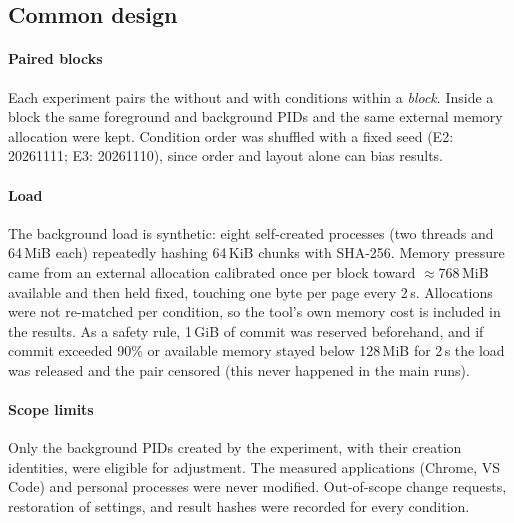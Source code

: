 \documentclass[11pt]{article}
\begin{document}
\subsection{Common design}
\paragraph{Paired blocks}
Each experiment pairs the without and with conditions within a \emph{block}. Inside a block the same foreground and background PIDs and the same external memory allocation were kept. Condition order was shuffled with a fixed seed (E2: 20261111; E3: 20261110), since order and layout alone can bias results.

\paragraph{Load}
The background load is synthetic: eight self-created processes (two threads and 64\,MiB each) repeatedly hashing 64\,KiB chunks with SHA-256. Memory pressure came from an external allocation calibrated once per block toward $\approx$768\,MiB available and then held fixed, touching one byte per page every 2\,s. Allocations were not re-matched per condition, so the tool's own memory cost is included in the results. As a safety rule, 1\,GiB of commit was reserved beforehand, and if commit exceeded 90\% or available memory stayed below 128\,MiB for 2\,s the load was released and the pair censored (this never happened in the main runs).

\paragraph{Scope limits}
Only the background PIDs created by the experiment, with their creation identities, were eligible for adjustment. The measured applications (Chrome, VS Code) and personal processes were never modified. Out-of-scope change requests, restoration of settings, and result hashes were recorded for every condition.
\end{document}
